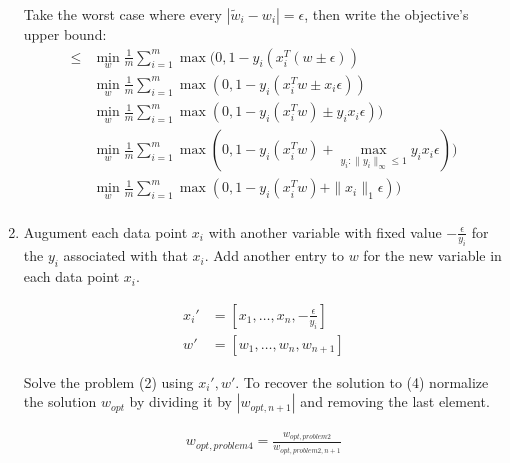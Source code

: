 \documentclass[11pt]{article}
\begin{document}
\begin{solution}
\begin{enumerate}
    Take the worst case where every $| \tilde{w}_i - w_i | = \epsilon$, then write the objective's upper bound:
    \begin{align*}
        \leq &\min_{w} \frac{1}{m} \sum_{i=1}^m \max(0, 1 - y_i(x_i^T (w \pm \epsilon)) \\
        &\min_{w} \frac{1}{m} \sum_{i=1}^m \max(0, 1 - y_i(x_i^T w \pm x_i \epsilon)) \\
        &\min_{w} \frac{1}{m} \sum_{i=1}^m \max(0, 1 - y_i(x_i^T w) \pm y_i x_i \epsilon)) \\
        &\min_{w} \frac{1}{m} \sum_{i=1}^m \max(0, 1 - y_i(x_i^T w) + \max_{y_i: \|y_i\|_{\infty} \leq 1} y_i x_i \epsilon)) \\
        &\min_{w} \frac{1}{m} \sum_{i=1}^m \max(0, 1 - y_i(x_i^T w) + \|x_i\|_1 \epsilon)) \\
    \end{align*}

    \item Augument each data point $x_i$ with another variable with fixed value $-\frac{\epsilon}{y_i}$ for the $y_i$ associated with that $x_i$. Add another entry to $w$ for the new variable in each data point $x_i$.

    \begin{align*}
        x_i' &= [x_1, \dots, x_n, -\frac{\epsilon}{y_i}] \\
        w' &= [w_1, \dots, w_n, w_{n+1}]
    \end{align*}

    Solve the problem (2) using $x_i', w'$. To recover the solution to (4) normalize the solution $w_{opt}$ by dividing it by $|w_{opt,n+1}|$ and removing the last element.

    \begin{align*}
        w_{opt,problem4} = \frac{w_{opt,problem2}}{w_{opt,problem2,n+1}}
    \end{align*}
\end{enumerate}
\end{solution}
\end{document}

